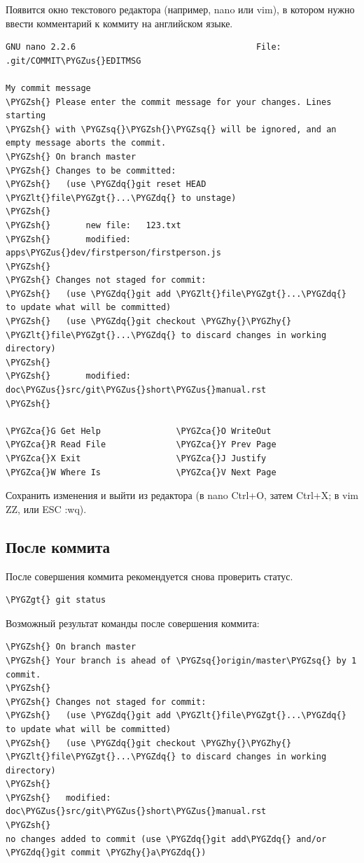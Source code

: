 \documentclass[a4paper,12pt,oneside]{sphinxmanual}
\def\PYGZus{\char`\_}
\def\PYGZca{\char`\^}
\def\PYGZlt{\char`\<}
\def\PYGZgt{\char`\>}
\def\PYGZsh{\char`\#}
\def\PYGZhy{\char`\-}
\def\PYGZsq{\char`\'}
\def\PYGZdq{\char`\"}
\begin{document}
Появится окно текстового редактора (например, nano или vim), в котором нужно ввести комментарий к коммиту на английском языке.

\begin{Verbatim}[commandchars=\\\{\}]
  GNU nano 2.2.6                                    File: .git/COMMIT\PYGZus{}EDITMSG

My commit message
\PYGZsh{} Please enter the commit message for your changes. Lines starting
\PYGZsh{} with \PYGZsq{}\PYGZsh{}\PYGZsq{} will be ignored, and an empty message aborts the commit.
\PYGZsh{} On branch master
\PYGZsh{} Changes to be committed:
\PYGZsh{}   (use \PYGZdq{}git reset HEAD \PYGZlt{}file\PYGZgt{}...\PYGZdq{} to unstage)
\PYGZsh{}
\PYGZsh{}       new file:   123.txt
\PYGZsh{}       modified:   apps\PYGZus{}dev/firstperson/firstperson.js
\PYGZsh{}
\PYGZsh{} Changes not staged for commit:
\PYGZsh{}   (use \PYGZdq{}git add \PYGZlt{}file\PYGZgt{}...\PYGZdq{} to update what will be committed)
\PYGZsh{}   (use \PYGZdq{}git checkout \PYGZhy{}\PYGZhy{} \PYGZlt{}file\PYGZgt{}...\PYGZdq{} to discard changes in working directory)
\PYGZsh{}
\PYGZsh{}       modified:   doc\PYGZus{}src/git\PYGZus{}short\PYGZus{}manual.rst
\PYGZsh{}

\PYGZca{}G Get Help               \PYGZca{}O WriteOut               \PYGZca{}R Read File              \PYGZca{}Y Prev Page
\PYGZca{}X Exit                   \PYGZca{}J Justify                \PYGZca{}W Where Is               \PYGZca{}V Next Page
\end{Verbatim}

Сохранить изменения и выйти из редактора (в nano Ctrl+O, затем Ctrl+X; в vim ZZ, или ESC :wq).


\subsection{После коммита}
\label{git_short_manual:id14}
После совершения коммита рекомендуется снова проверить статус.

\begin{Verbatim}[commandchars=\\\{\}]
\PYGZgt{} git status
\end{Verbatim}

Возможный результат команды  после совершения коммита:

\begin{Verbatim}[commandchars=\\\{\}]
\PYGZsh{} On branch master
\PYGZsh{} Your branch is ahead of \PYGZsq{}origin/master\PYGZsq{} by 1 commit.
\PYGZsh{}
\PYGZsh{} Changes not staged for commit:
\PYGZsh{}   (use \PYGZdq{}git add \PYGZlt{}file\PYGZgt{}...\PYGZdq{} to update what will be committed)
\PYGZsh{}   (use \PYGZdq{}git checkout \PYGZhy{}\PYGZhy{} \PYGZlt{}file\PYGZgt{}...\PYGZdq{} to discard changes in working directory)
\PYGZsh{}
\PYGZsh{}   modified:   doc\PYGZus{}src/git\PYGZus{}short\PYGZus{}manual.rst
\PYGZsh{}
no changes added to commit (use \PYGZdq{}git add\PYGZdq{} and/or \PYGZdq{}git commit \PYGZhy{}a\PYGZdq{})
\end{Verbatim}
\end{document}
